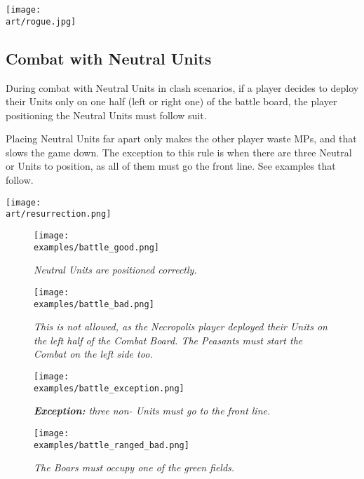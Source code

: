 \begin{multicols}{2}
\texttt{[image: \\art/rogue.jpg]}

\subsection*{Combat with Neutral Units}

During combat with Neutral Units in clash scenarios, if a player decides to deploy their Units only on one half (left or right one) of the battle board, the player positioning the Neutral Units must follow suit.

Placing Neutral Units far apart only makes the other player waste MPs, and that slows the game down.
The exception to this rule is when there are three Neutral  or  Units to position, as all of them must go the front line.
See examples that follow.

\begin{center}
  \texttt{[image: \\art/resurrection.png]}
\end{center}

\end{multicols}

\begin{figure*}[!h]
  \mbox{}
  \hfill
  \begin{minipage}[t]{0.44\textwidth}
    \centering
    \texttt{[image: \\examples/battle\_good.png]}
    \caption[good protected]{\textit{Neutral Units are positioned correctly.}}
  \end{minipage}
  \hfill
  \begin{minipage}[t]{0.44\textwidth}
    \centering
    \texttt{[image: \\examples/battle\_bad.png]}
    \caption[bad protected]{\textit{This is not allowed, as the Necropolis player deployed their Units on the left half of the Combat Board.
      The Peasants must start the Combat on the left side too.}}
  \end{minipage}
  \hfill
  \mbox{}
\end{figure*}

\clearpage

\begin{figure*}[!h]
  \mbox{}
  \hfill
  \begin{minipage}[t]{0.44\textwidth}
    \centering
    \texttt{[image: \\examples/battle\_exception.png]}
    \caption[exception protected]{\textit{\textbf{Exception:} three non- Units must go to the front line.}}
  \end{minipage}
  \hfill
  \begin{minipage}[t]{0.44\textwidth}
    \centering
    \texttt{[image: \\examples/battle\_ranged\_bad.png]}
    \caption[ranged protected]{\textit{The Boars must occupy one of the green fields.}}
  \end{minipage}
  \hfill
  \mbox{}
\end{figure*}

